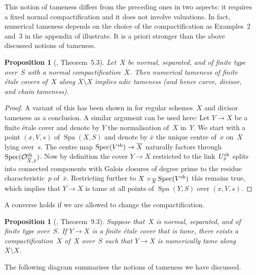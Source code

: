 \documentclass[a4paper,twoside,11pt,reqno]{amsart}
\newcommand{\cO}{{\mathcal O}}
\DeclareMathOperator{\Spec}{Spec}
\DeclareMathOperator{\Spa}{Spa}
\newcommand{\sh}{{\rm sh}}   %
\newcommand{\ov}[1]{\overline{#1}}
\newtheorem{prop}[thm]{Proposition}
\theoremstyle{definition}
\numberwithin{equation}{subsection}
\begin{document}
This notion of tameness differs from the preceding ones in two aspects: it requires a fixed normal compactification and it does not involve valuations.
In fact, numerical tameness depends on the choice of the compactification as Examples~2 and~3 in the appendix of \cite{KerzSchmidt2010:DifferentNotionsTameness} illustrate.
It is a priori stronger than the above discussed notions of tameness.

\begin{prop}[\cite{KerzSchmidt2010:DifferentNotionsTameness}, Theorem~5.3] \label{numerical-implies-tame}
    Let~$X$ be normal, separated, and of finite type over~$S$ with a normal compactification~$\ov X$.
    Then numerical tameness of finite étale covers of~$X$ along $\ov X \setminus X$ implies adic tameness (and hence curve, divisor, and chain tameness).
\end{prop}

\begin{proof}
    A variant of this has been shown in \cite[Theorem~5.3]{KerzSchmidt2010:DifferentNotionsTameness} for regular schemes~$X$ and divisor tameness as a conclusion.
    A similar argument can be used here:
    Let $Y \to X$ be a finite étale cover and denote by $\ov Y$ the normalisation of~$\ov X$ in~$Y$.
    We start with a point $(x,V,s)$ of $\Spa(X,S)$ and denote by $\bar{x}$ the unique centre of~$x$ on~$\ov X$ lying over~$s$.
    The centre map $\Spec(V^\sh )\to \ov X$ naturally factors through $\Spec(\cO_{\ov X,\bar{x}}^\sh)$.
    Now by definition the cover $Y \to X$ restricted to the link~$U_{\bar x}^{\sh}$ splits into connected components with Galois closures of degree prime to the residue characteristic~$p$ of~$\bar{x}$.
    Restricting further to $X \times_{\ov X} \Spec(V^\sh)$ this remains true, which implies that $Y \to X$ is tame at all points of $\Spa(Y,S)$ over $(x,V,s)$.
\end{proof}

A converse holds if we are allowed to change the compactification.

\begin{prop}[\cite{HuebnerTemkin2026:WildLocus}, Theorem~9.3]
    Suppose that~$X$ is normal, separated, and of finite type over~$S$.
    If $Y \to X$ is a finite étale cover that is tame, there exists a compactification~$\ov X$ of~$X$ over~$S$ such that $Y \to X$ is numerically tame along $\ov X \setminus X$.
\end{prop}

The following diagram summarises the notions of tameness we have discussed.
\end{document}
